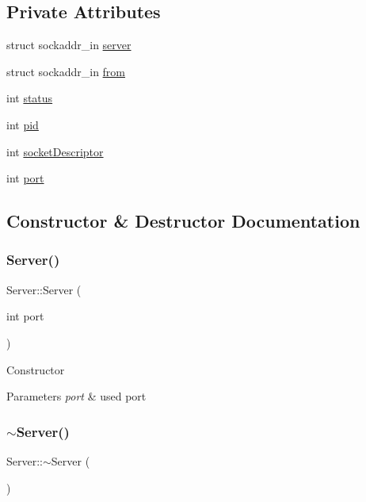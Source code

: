 \subsection*{Private Attributes}
\begin{DoxyCompactItemize}
\item 
struct sockaddr\+\_\+in \mbox{\hyperlink{classServer_af10e93ccde1ccedd999726519b628f68}{server}}
\item 
struct sockaddr\+\_\+in \mbox{\hyperlink{classServer_a630123b8292df5f3947d82027ec7991b}{from}}
\item 
int \mbox{\hyperlink{classServer_a4073381c056bef47db16d0472c4b31a9}{status}}
\item 
int \mbox{\hyperlink{classServer_a519ae955c6db43f4b832626b8d7518a7}{pid}}
\item 
int \mbox{\hyperlink{classServer_a5e52b598760882795a7ea0aada7cb9b7}{socket\+Descriptor}}
\item 
int \mbox{\hyperlink{classServer_a926c9dae229a62b6d33fdbb41dca6d82}{port}}
\end{DoxyCompactItemize}


\subsection{Constructor \& Destructor Documentation}
\mbox{\label{classServer_a7d1fe6ba5f0fe9190a4f039662ea0e85}} 
\subsubsection{\texorpdfstring{Server()}{Server()}}
{\footnotesize\ttfamily Server\+::\+Server (\begin{DoxyParamCaption}\item[{int}]{port }\end{DoxyParamCaption})}

Constructor 
\begin{DoxyParams}{Parameters}
{\em port} & used port \\
\hline
\end{DoxyParams}
\mbox{\label{classServer_a4b3aa2579cb1c8cd1d069582c14d0fa6}} 
\subsubsection{\texorpdfstring{$\sim$\+Server()}{~Server()}}
{\footnotesize\ttfamily Server\+::$\sim$\+Server (\begin{DoxyParamCaption}{ }\end{DoxyParamCaption})}

